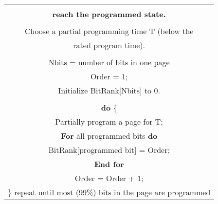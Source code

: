 
\begin{center}

\begin{tabular}{|c|}
\hline
\begin{minipage}[t]{3.2in}



\begin{tabbing}
{\bf Algorithm V  Extract the order in which bits in a page }
\\ {\bf reach the programmed state. }
\\
\\ Choose a partial programming time T (below the 
\\ rated program time). 
\\
\\ Nbits = number of bits in one page
\\ Order = 1; 
\\ Initialize BitRank[Nbits] to 0.
\\
\\ {\bf do} \= \{
\\ \>    Partially program a page for T;
\\ \>    {\bf For} \= all programmed bits {\bf do}
\\ \>\>        BitRank[programmed bit] = Order;
\\ \>    {\bf End for}
\\ \>    Order = Order + 1;
\\ \} repeat until most (99\%) bits in the page are programmed 


\end{tabbing}
\end{minipage}
\\ \hline
\end{tabular}
\end{center}
